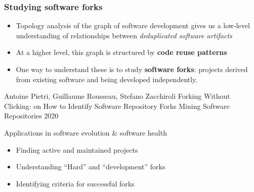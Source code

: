 \documentclass[aspectratio=169,xcolor=table]{beamer}
\begin{document}
    \begin{frame}
        \frametitle{Studying software forks}

        \begin{block}{}

            \begin{itemize}
                \item Topology analysis of the graph of software development
                    gives us a low-level understanding of relationships between
                    \emph{deduplicated software artifacts}
                \item At a higher level, this graph is structured by
                    \textbf{code reuse patterns}
                \item One way to understand these is to study \textbf{software
                    forks}: projects derived from existing software and being
                    developed independently.
            \end{itemize}

            \footnotesize
            \begin{thebibliography}{swhforks}
                 Antoine Pietri, Guillaume Rousseau, Stefano Zacchiroli\newblock
                Forking Without Clicking: on How to Identify Software Repository Forks\newblock
                Mining Software Repositories 2020\newblock
            \end{thebibliography}
        \end{block}

        \begin{block}{Applications in software evolution \& software health}
            \begin{itemize}
                \item Finding active and maintained projects
                \item Understanding ``Hard'' and ``development'' forks
                \item Identifying criteria for successful forks
            \end{itemize}
        \end{block}
    \end{frame}

\end{document}
